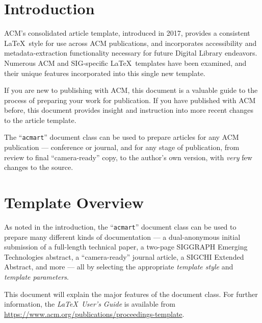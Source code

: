 \documentclass[sigconf]{acmart}
\begin{document}
	
	\maketitle
	
	\section{Introduction}
	ACM's consolidated article template, introduced in 2017, provides a
	consistent \LaTeX\ style for use across ACM publications, and
	incorporates accessibility and metadata-extraction functionality
	necessary for future Digital Library endeavors. Numerous ACM and
	SIG-specific \LaTeX\ templates have been examined, and their unique
	features incorporated into this single new template.
	
	If you are new to publishing with ACM, this document is a valuable
	guide to the process of preparing your work for publication. If you
	have published with ACM before, this document provides insight and
	instruction into more recent changes to the article template.
	
	The ``\verb|acmart|'' document class can be used to prepare articles
	for any ACM publication --- conference or journal, and for any stage
	of publication, from review to final ``camera-ready'' copy, to the
	author's own version, with {\itshape very} few changes to the source.
	
	\section{Template Overview}
	As noted in the introduction, the ``\verb|acmart|'' document class can
	be used to prepare many different kinds of documentation --- a
	dual-anonymous initial submission of a full-length technical paper, a
	two-page SIGGRAPH Emerging Technologies abstract, a ``camera-ready''
	journal article, a SIGCHI Extended Abstract, and more --- all by
	selecting the appropriate {\itshape template style} and {\itshape
		template parameters}.
	
	This document will explain the major features of the document
	class. For further information, the {\itshape \LaTeX\ User's Guide} is
	available from
	\url{https://www.acm.org/publications/proceedings-template}.
	
\end{document}
